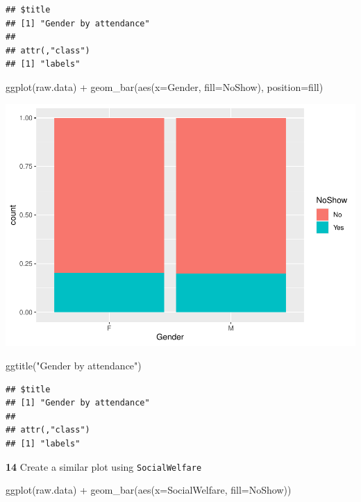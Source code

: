 \documentclass[
]{article}
\newenvironment{Shaded}{\begin{snugshade}}{\end{snugshade}}
\newcommand{\AttributeTok}[1]{\textcolor[rgb]{0.77,0.63,0.00}{#1}}
\newcommand{\FunctionTok}[1]{\textcolor[rgb]{0.00,0.00,0.00}{#1}}
\newcommand{\NormalTok}[1]{#1}
\newcommand{\SpecialCharTok}[1]{\textcolor[rgb]{0.00,0.00,0.00}{#1}}
\newcommand{\StringTok}[1]{\textcolor[rgb]{0.31,0.60,0.02}{#1}}
\begin{document}
\begin{verbatim}
## $title
## [1] "Gender by attendance"
## 
## attr(,"class")
## [1] "labels"
\end{verbatim}

\begin{Shaded}
\begin{Highlighting}[]
\FunctionTok{ggplot}\NormalTok{(raw.data) }\SpecialCharTok{+} 
  \FunctionTok{geom\_bar}\NormalTok{(}\FunctionTok{aes}\NormalTok{(}\AttributeTok{x=}\NormalTok{Gender, }\AttributeTok{fill=}\NormalTok{NoShow), }\AttributeTok{position=}\StringTok{\textquotesingle{}fill\textquotesingle{}}\NormalTok{)}
\end{Highlighting}
\end{Shaded}

\begin{center}\includegraphics{lab1_medical_databases_files/figure-latex/unnamed-chunk-12-2} \end{center}

\begin{Shaded}
\begin{Highlighting}[]
  \FunctionTok{ggtitle}\NormalTok{(}\StringTok{"Gender by attendance"}\NormalTok{)}
\end{Highlighting}
\end{Shaded}

\begin{verbatim}
## $title
## [1] "Gender by attendance"
## 
## attr(,"class")
## [1] "labels"
\end{verbatim}

\textbf{14} Create a similar plot using \texttt{SocialWelfare}

\begin{Shaded}
\begin{Highlighting}[]
\FunctionTok{ggplot}\NormalTok{(raw.data) }\SpecialCharTok{+} 
  \FunctionTok{geom\_bar}\NormalTok{(}\FunctionTok{aes}\NormalTok{(}\AttributeTok{x=}\NormalTok{SocialWelfare, }\AttributeTok{fill=}\NormalTok{NoShow))}
\end{Highlighting}
\end{Shaded}
\end{document}
